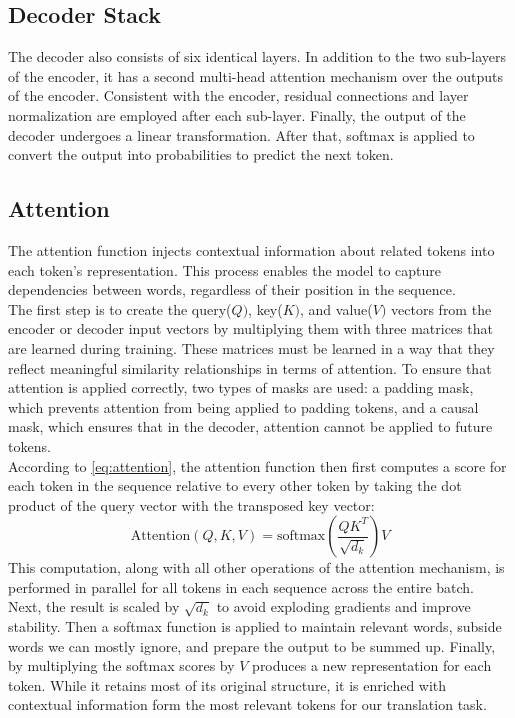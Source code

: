 \subsection{Decoder Stack} 
The decoder also consists of six identical layers.
In addition to the two sub-layers of the encoder, it has a second multi-head attention mechanism over the outputs of the encoder.
Consistent with the encoder, residual connections and layer normalization are employed after each sub-layer.
Finally, the output of the decoder undergoes a linear transformation. After that, softmax is applied to convert the output into probabilities to predict the next token.

\subsection{Attention}\label{sec:attention}
The attention function injects contextual information about related tokens into each token's representation.
This process enables the model to capture dependencies between words, regardless of their position in the sequence. \\
The first step is to create the query(\(Q)\), key(\(K)\), and value(\(V)\) vectors from the encoder or decoder input vectors by multiplying them with three matrices that are learned during training.
These matrices must be learned in a way that they reflect meaningful similarity relationships in terms of attention.
To ensure that attention is applied correctly, two types of masks are used: a padding mask, which prevents attention from being applied to padding tokens, and a causal mask, which ensures that in the decoder, attention cannot be applied to future tokens.\\
According to \cref{eq:attention}, the attention function then first computes a score for each token in the sequence relative to every other token by taking the dot product of the query vector with the transposed key vector:
\begin{equation}
    \text{Attention}(Q,K,V) = \text{softmax}\left(\frac{QK^T}{\sqrt{d_k}}\right)V
    \label{eq:attention}
\end{equation}
This computation, along with all other operations of the attention mechanism, is performed in parallel for all tokens in each sequence across the entire batch.
Next, the result is scaled by \(\sqrt{d_k}\) to avoid exploding gradients and improve stability.
Then a softmax function is applied to maintain relevant words, subside words we can mostly ignore, and prepare the output to be summed up.
Finally, by multiplying the softmax scores by \(V\) produces a new representation for each token.
While it retains most of its original structure, it is enriched with contextual information form the most relevant tokens for our translation task. \\

